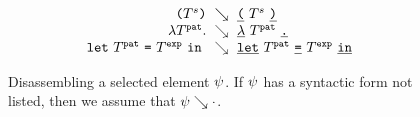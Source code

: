 \begin{figure}
  \newcommand{\dd}{\searrow}
  \[
    \arraycolsep=3pt
    \begin{array}{rcl}
      \sparen{\tiles^s} & \dd & \tokenLit{\texttt{(}}~\tiles^s~\tokenLit{\texttt{)}} \\
      \slam{\tiles^{\pat}} & \dd & \tokenLit{\lambda}~\tiles^{\pat}~\tokenLit{\texttt{.}} \\
      \slet{\tiles^{\pat}}{\tiles^{\expr}}{} & \dd & \tokenLit{\texttt{let}}~\tiles^{\pat}~\tokenLit{\texttt{=}}~\tiles^{\expr}~\tokenLit{\texttt{in}}
  \end{array}\]
  \caption{
    Disassembling a selected element $\psi$.
    If $\psi$ has a syntactic form not listed, then we assume that $\psi \searrow \cdot$.
  }
  \label{fig:disassemble-tile}
\end{figure}